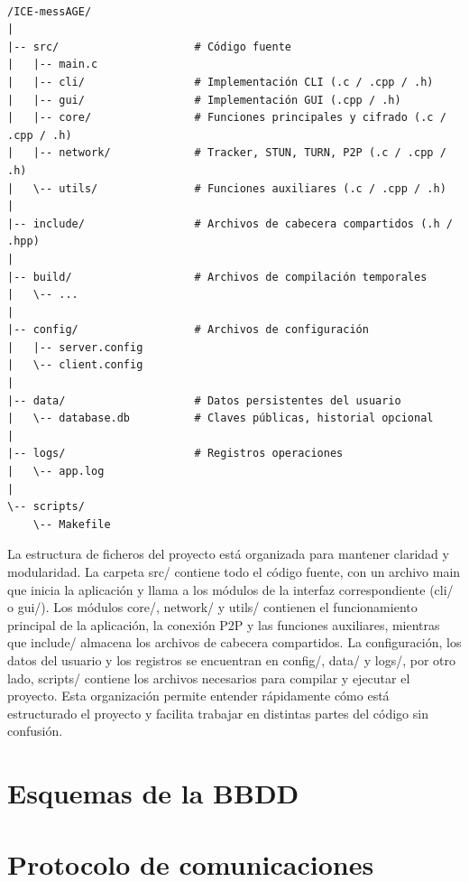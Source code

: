 \documentclass{article}
\begin{document}
  \begin{verbatim}

/ICE-messAGE/
|
|-- src/                     # Código fuente
|   |-- main.c 
|   |-- cli/                 # Implementación CLI (.c / .cpp / .h)
|   |-- gui/                 # Implementación GUI (.cpp / .h)
|   |-- core/                # Funciones principales y cifrado (.c / .cpp / .h)
|   |-- network/             # Tracker, STUN, TURN, P2P (.c / .cpp / .h)
|   \-- utils/               # Funciones auxiliares (.c / .cpp / .h)
|
|-- include/                 # Archivos de cabecera compartidos (.h / .hpp)
|
|-- build/                   # Archivos de compilación temporales
|   \-- ...
|
|-- config/                  # Archivos de configuración
|   |-- server.config          
|   \-- client.config         
|
|-- data/                    # Datos persistentes del usuario
|   \-- database.db          # Claves públicas, historial opcional
|
|-- logs/                    # Registros operaciones
|   \-- app.log
|
\-- scripts/                
    \-- Makefile

  \end{verbatim}

La estructura de ficheros del proyecto está organizada para mantener claridad y modularidad. La carpeta src/ contiene todo el código fuente, con un archivo main que inicia la aplicación y llama a los módulos de la interfaz correspondiente (cli/ o gui/). Los módulos core/, network/ y utils/ contienen el funcionamiento principal de la aplicación, la conexión P2P y las funciones auxiliares, mientras que include/ almacena los archivos de cabecera compartidos. La configuración, los datos del usuario y los registros se encuentran en config/, data/ y logs/, por otro lado, scripts/ contiene los archivos necesarios para compilar y ejecutar el proyecto. Esta organización permite entender rápidamente cómo está estructurado el proyecto y facilita trabajar en distintas partes del código sin confusión.

\section{Esquemas de la BBDD}
  \section{Protocolo de comunicaciones}
    
\end{document}
